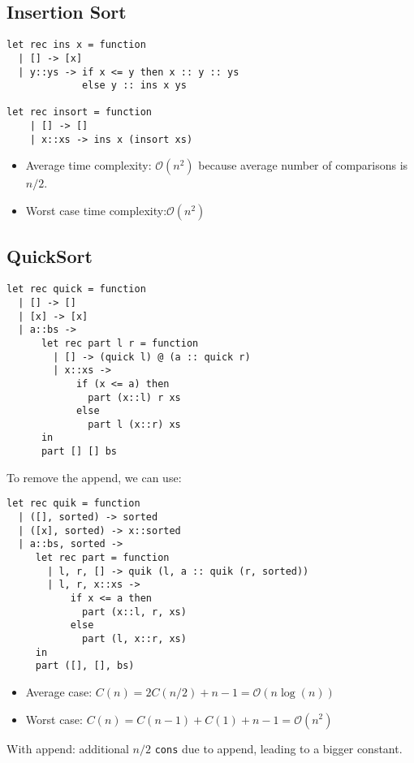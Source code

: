 \documentclass[12pt,a4paper]{article} %
\begin{document}
\subsection{Insertion Sort}
\begin{lstlisting}[language=caml]
let rec ins x = function
  | [] -> [x]
  | y::ys -> if x <= y then x :: y :: ys
             else y :: ins x ys
             
let rec insort = function
    | [] -> []
    | x::xs -> ins x (insort xs)
\end{lstlisting}
\begin{itemize}
\item Average time complexity: $\mathcal{O}(n^2)$ because average number of comparisons is $n/2$.
\item Worst case time complexity:$\mathcal{O}(n^2)$
\end{itemize}
\subsection{QuickSort}
\begin{lstlisting}[language=caml]
let rec quick = function
  | [] -> []
  | [x] -> [x]
  | a::bs ->
      let rec part l r = function
        | [] -> (quick l) @ (a :: quick r)
        | x::xs ->
            if (x <= a) then
              part (x::l) r xs
            else
              part l (x::r) xs
      in
      part [] [] bs
\end{lstlisting}
To remove the append, we can use:
\begin{lstlisting}[language=caml]
let rec quik = function
  | ([], sorted) -> sorted
  | ([x], sorted) -> x::sorted
  | a::bs, sorted ->
     let rec part = function
       | l, r, [] -> quik (l, a :: quik (r, sorted))
       | l, r, x::xs ->
           if x <= a then
             part (x::l, r, xs)
           else
             part (l, x::r, xs)
     in
     part ([], [], bs)
\end{lstlisting}
\begin{itemize}
\item Average case: $C(n)=2C(n/2)+n-1=\mathcal{O}(n\log(n))$
\item Worst case: $C(n)=C(n-1)+C(1)+n-1=\mathcal{O}(n^2)$
\end{itemize}
With append: additional $n/2$ \verb|cons| due to append, leading to a bigger constant.
\end{document}
